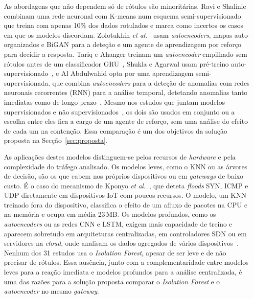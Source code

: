 \documentclass[conference,a4paper]{IEEEtran}
\begin{document}
As abordagens que não dependem só de rótulos são minoritárias. Ravi e
Shalinie~\cite{ravi2020semisupervised} combinam uma rede neuronal com K-means num esquema
semi-supervisionado que treina com apenas 10\% dos dados rotulados e marca como incertos
os casos em que os modelos discordam. Zolotukhin \textit{et al.}~\cite{zolotukhin2021curious}
usam \textit{autoencoders}, mapas auto-organizados e BiGAN para a deteção e um agente de
aprendizagem por reforço para decidir a resposta. Tariq e Ahanger treinam um
\textit{autoencoder} empilhado sem rótulos antes de um classificador
GRU~\cite{tariq2025saegru}, Shukla e Agarwal usam pré-treino
auto-supervisionado~\cite{shukla2026cyber}, e Al Abdulwahid opta por uma aprendizagem
semi-supervisionada, que combina \textit{autoencoders} para a deteção de anomalias com
redes neuronais recorrentes (RNN) para a análise temporal, detetando anomalias tanto
imediatas como de longo prazo~\cite{Abdulwahid2025}.
Mesmo nos estudos que juntam modelos supervisionados e não
supervisionados~\cite{zolotukhin2021curious,tariq2025saegru,Abdulwahid2025}, os dois são
usados em conjunto ou a escolha entre eles fica a cargo de um agente de reforço, sem uma
análise do efeito de cada um na contenção. Essa comparação é um dos
objetivos da solução proposta na Secção~\ref{sec:proposta}.

As aplicações destes modelos distinguem-se pelos recursos de \textit{hardware} e pela
complexidade do tráfego analisado. Os modelos leves, como o KNN ou as árvores de
decisão, são os que cabem nos próprios dispositivos ou em \textit{gateways} de baixo
custo. É o caso do mecanismo de Kponyo
\textit{et al.}~\cite{kponyo2020lightweight}, que deteta \textit{floods} SYN, ICMP e UDP
diretamente em dispositivos IoT com poucos recursos. O modelo, um KNN treinado fora do
dispositivo, classifica o efeito de um afluxo de pacotes na CPU e na memória e ocupa em
média 23\,MB. Os modelos profundos, como os \textit{autoencoders} ou as redes CNN e LSTM,
exigem mais capacidade de treino e aparecem sobretudo em arquiteturas centralizadas, em
controladores SDN ou em servidores na \textit{cloud}, onde analisam os dados agregados de
vários
dispositivos~\cite{zolotukhin2021curious,tawfik2021internet,rose2022ideres}.
Nenhum dos 31 estudos usa o \textit{Isolation Forest}, apesar de ser leve e de não
precisar de rótulos. Essa ausência, junto com a complementaridade entre modelos leves para
a reação imediata e modelos profundos para a análise centralizada, é uma das razões para
a solução proposta comparar o \textit{Isolation Forest} e o \textit{autoencoder} no
mesmo \textit{gateway}.
\end{document}
